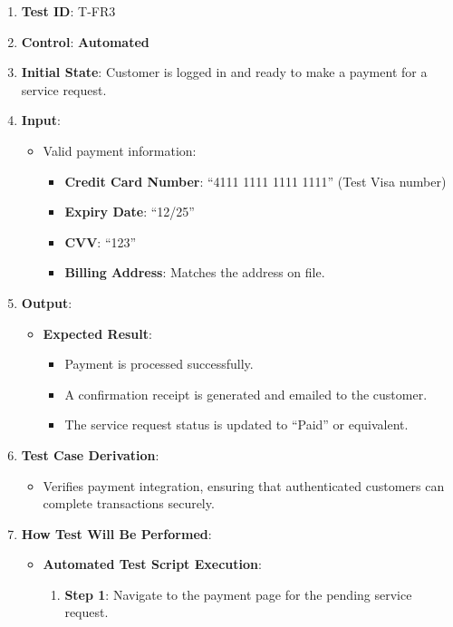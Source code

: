 \documentclass[12pt, titlepage]{article}
\begin{document}
\begin{enumerate}
    \item \textbf{Test ID}: T-FR3
    \item \textbf{Control}: \textbf{Automated}
    \item \textbf{Initial State}: Customer is logged in and ready to make a payment for a service request.
    \item \textbf{Input}:
    \begin{itemize}
        \item Valid payment information:
        \begin{itemize}
            \item \textbf{Credit Card Number}: ``4111 1111 1111 1111'' (Test Visa number)
            \item \textbf{Expiry Date}: ``12/25''
            \item \textbf{CVV}: ``123''
            \item \textbf{Billing Address}: Matches the address on file.
        \end{itemize}
    \end{itemize}
    \item \textbf{Output}:
    \begin{itemize}
        \item \textbf{Expected Result}:
        \begin{itemize}
            \item Payment is processed successfully.
            \item A confirmation receipt is generated and emailed to the customer.
            \item The service request status is updated to ``Paid'' or equivalent.
        \end{itemize}
    \end{itemize}
    \item \textbf{Test Case Derivation}:
    \begin{itemize}
        \item Verifies payment integration, ensuring that authenticated customers can complete transactions securely.
    \end{itemize}
    \item \textbf{How Test Will Be Performed}:
    \begin{itemize}
        \item \textbf{Automated Test Script Execution}:
        \begin{enumerate}
            \item \textbf{Step 1}: Navigate to the payment page for the pending service request.

\end{enumerate}
\end{itemize}
\end{enumerate}
\end{document}
